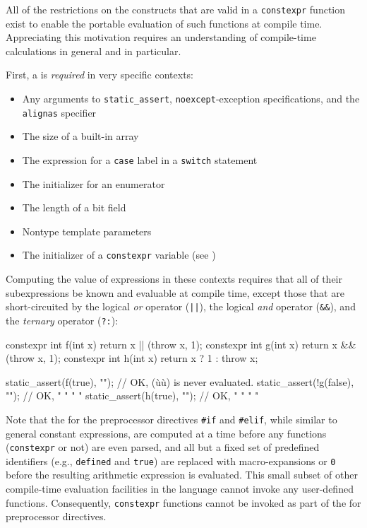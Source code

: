 All of the restrictions on the constructs that are valid in a
\lstinline!constexpr! function exist to enable the portable evaluation of
such functions at compile time. Appreciating this motivation requires an
understanding of compile-time calculations in general and
 in particular.

First, a  is \emph{required} in very
specific contexts:

\begin{itemize}
\item{Any arguments to \lstinline!static_assert!, \lstinline!noexcept!-exception specifications, and the \lstinline!alignas! specifier}
\item{The size of a built-in array}
\item{The expression for a \lstinline!case! label in a \lstinline!switch! statement}
\item{The initializer for an enumerator}
\item{The length of a bit field}
\item{Nontype template parameters}
\item{The initializer of a \lstinline!constexpr! variable (see )}
\end{itemize}

Computing the value of expressions in these contexts requires that all
of their subexpressions be known and evaluable at compile time, except
those that are short-circuited by the logical \emph{or} operator
(\lstinline!||!), the logical \emph{and} operator (\lstinline!&&!), and the
\emph{ternary} operator (\lstinline!?:!):

\begin{emcppslisting}
constexpr int f(int x) { return x || (throw x, 1); }
constexpr int g(int x) { return x && (throw x, 1); }
constexpr int h(int x) { return x ? 1 : throw x; }

static_assert(f(true), "");    // OK, (ù{}ù) is never evaluated.
static_assert(!g(false), "");  // OK,     "     "    "      "
static_assert(h(true), "");    // OK,     "     "    "      "
\end{emcppslisting}
    

\noindent Note that the  for the
preprocessor directives \lstinline!#if! and \lstinline!#elif!, while similar
to general constant expressions, are computed at a time before any
functions (\lstinline!constexpr! or not) are even parsed, and all but a
fixed set of predefined identifiers (e.g., \lstinline!defined! and
\lstinline!true!) are replaced with macro-expansions or \lstinline!0! before
the resulting arithmetic expression is evaluated. This small subset of
other compile-time evaluation facilities in the language cannot invoke
any user-defined functions. Consequently, \lstinline!constexpr! functions
cannot be invoked as part of the  for preprocessor directives.

